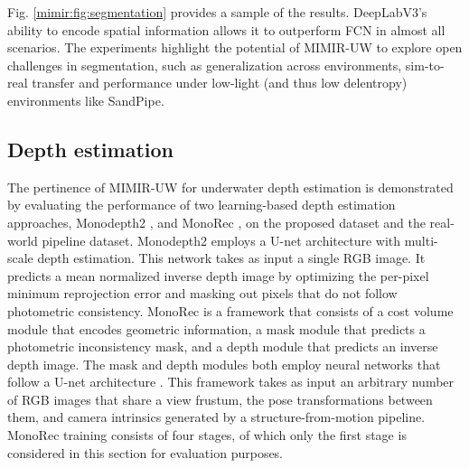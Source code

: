 Fig. \ref{mimir:fig:segmentation} provides a sample of the results. DeepLabV3's ability to encode spatial information allows it to outperform FCN in almost all scenarios. The experiments highlight the potential of MIMIR-UW to explore open challenges in segmentation, such as generalization across environments, sim-to-real transfer and performance under low-light (and thus low delentropy) environments like SandPipe.




\subsection{Depth estimation}

The pertinence of MIMIR-UW for underwater depth estimation is demonstrated by evaluating the performance of two learning-based depth estimation approaches, Monodepth2 \cite{monodepth2}, and MonoRec \cite{wimbauer2020monorec}, on the proposed dataset and the real-world pipeline dataset.
Monodepth2 employs a U-net architecture \cite{ronneberger2015u} with multi-scale depth estimation. This network takes as input a single RGB image.  It predicts a mean normalized inverse depth image by optimizing the per-pixel minimum reprojection error and masking out pixels that do not follow photometric consistency. MonoRec is a framework that consists of 
a cost volume module that encodes geometric information, a mask module that predicts a photometric inconsistency mask, and a depth module that predicts an inverse depth image. The mask and depth modules both employ neural networks that follow a U-net architecture \cite{ronneberger2015u}. This framework takes as input an arbitrary number of RGB images that share a view frustum, the pose transformations between them, and camera intrinsics generated by a structure-from-motion pipeline. MonoRec training consists of four stages, of which only the first stage is considered in this section for evaluation purposes.

